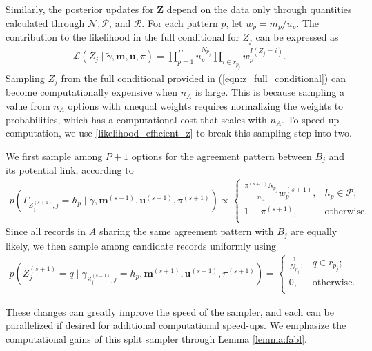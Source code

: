 \documentclass[ba]{imsart}
\begin{document}
Similarly, the posterior updates for $\bm{Z}$ depend on the data only through quantities calculated through $\mathcal{N}, \mathcal{P}$, and $\mathcal{R}$. For each pattern $p$, let $w_p =m_p/u_p$.  The contribution to the likelihood in the full conditional for $Z_j$ can be expressed as
\begin{align}
	\mathcal{L}(Z_j\mid  \tilde{\gamma}, \bm{m}, \bm{u}, \pi) = \prod_{p=1}^P u_p^{N_{p_j}} \prod_{i \in r_{p_j}} w_p^{I(Z_j = i)}. \label{likelihood_efficient_z}
\end{align}
Sampling $Z_j$ from the full conditional provided in (\ref{eqn:z_full_conditional}) can become computationally expensive when $n_A$ is large. This is because sampling a value from $n_A$ options with unequal weights requires normalizing the weights to probabilities, which has a computational cost that scales with $n_A$. To speed up computation, we use \eqref{likelihood_efficient_z} to break this sampling step into two. 

We first sample among $P + 1$ options for the agreement pattern between $B_j$ and its potential link, according to
\begin{align}
	\label{eqn:gibbs1}
	p\left( \Gamma_{Z_j^{(s+1)}, j} = h_p \mid \tilde{\gamma}, \bm{m}^{(s+1)}, \bm{u}^{(s+1)}, \pi^{(s+1)}\right) \propto
	\begin{cases} 
		\frac{\pi^{(s+1)}N_{p_j}}{n_A}  w_{p}^{(s+1)},  & h_p \in \mathcal{P}; \\
		1- \pi^{(s+1)} , &   \text{otherwise}. \\
	\end{cases}
\end{align}
Since all records in $A$ sharing the same agreement pattern with $B_j$ are equally likely, we then sample among candidate records uniformly using
\begin{align}
	\label{eqn:gibbs2}
	p\left(Z_j^{(s+1)} = q \mid \gamma_{Z_j^{(s+1)}, j} = h_p, \bm{m}^{(s+1)}, \bm{u}^{(s+1)}, \pi^{(s+1)} \right) = \begin{cases} 
		\frac{1}{N_{p_j}}, & q \in r_{p_j}; \\
		0, & \text{otherwise.} \\
	\end{cases}
\end{align} 

These changes can greatly improve the speed of the sampler, and each can be parallelized if desired for additional computational speed-ups. We emphasize the computational gains of this split sampler through Lemma \ref{lemma:fabl}.
\end{document}
